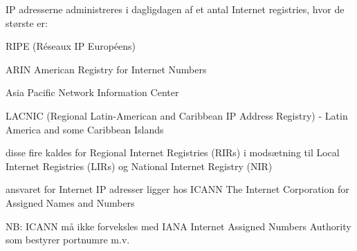 \documentclass[Screen16to9,17pt]{foils}
\begin{document}

\begin{list1}
\item IP adresserne administreres i dagligdagen af et antal Internet
  registries, hvor de største er:
\begin{list2}
\item RIPE (Réseaux IP Européens)  
\item ARIN American Registry for Internet Numbers 
\item Asia Pacific Network Information Center 
\item LACNIC (Regional Latin-American and Caribbean IP Address Registry) - Latin America and some Caribbean Islands
\end{list2}
\item disse fire kaldes for Regional Internet Registries (RIRs) i
  modsætning til Local Internet Registries (LIRs) og National Internet
  Registry (NIR)
\end{list1}


\begin{list1}
\item ansvaret for Internet IP adresser ligger hos ICANN The Internet
  Corporation for Assigned Names and Numbers\\
\item NB: ICANN må ikke forveksles med IANA Internet Assigned Numbers
  Authority  som bestyrer portnumre m.v.
\end{list1}


\end{document}
